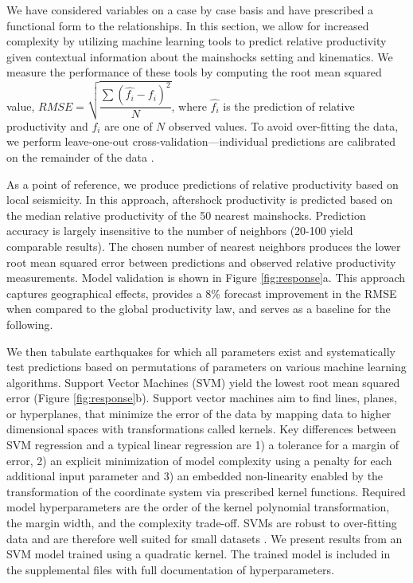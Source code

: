 \documentclass[draft, jgrga]{agujournal2018}
\begin{document}
    We have considered variables on a case by case basis and have prescribed a functional form to the relationships. In this section, we allow for increased complexity by utilizing machine learning tools to predict relative productivity given contextual information about the mainshocks setting and kinematics. We measure the performance of these tools by computing the root mean squared value, $RMSE = \sqrt{\dfrac{\sum{(\hat{f_i}-f_i)^2}}{N}} $, where $\hat{f_i}$ is the prediction of relative productivity and $f_i$ are one of $N$ observed values. To avoid over-fitting the data, we perform leave-one-out cross-validation---individual predictions are calibrated on the remainder of the data \citep{witten2011}.

    As a point of reference, we produce predictions of relative productivity based on local seismicity. In this approach, aftershock productivity is predicted based on the median relative productivity of the 50 nearest mainshocks. Prediction accuracy is largely insensitive to the number of neighbors (20-100 yield comparable results). The chosen number of nearest neighbors produces the lower root mean squared error between predictions and observed relative productivity measurements. Model validation is shown in Figure \ref{fig:response}a. This approach captures geographical effects, provides a 8\% forecast improvement in the RMSE when compared to the global productivity law, and serves as a baseline for the following.

    We then tabulate earthquakes for which all parameters exist and systematically test predictions based on permutations of parameters on various machine learning algorithms.  Support Vector Machines (SVM) yield the lowest root mean squared error (Figure \ref{fig:response}b). Support vector machines aim to find lines, planes, or hyperplanes, that minimize the error of the data by mapping data to higher dimensional spaces with transformations called kernels. Key differences between SVM regression and a typical linear regression are 1) a tolerance for a margin of error, 2) an explicit minimization of model complexity using a  penalty for each additional input parameter and 3) an embedded non-linearity enabled by the transformation of the coordinate system via prescribed kernel functions. Required model hyperparameters are the order of the kernel polynomial transformation, the margin width, and the complexity trade-off. SVMs are robust to over-fitting data and are therefore well suited for small datasets \citep{witten2011}. We present results from an SVM model trained using a quadratic kernel. The trained model is included in the supplemental files with full documentation of hyperparameters.
\end{document}
